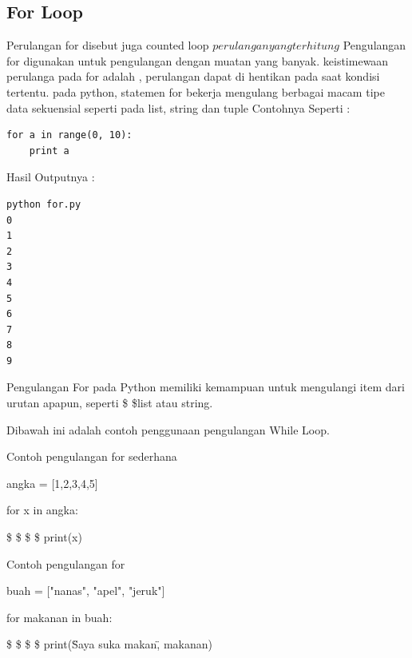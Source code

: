 \subsection{For Loop}
Perulangan for disebut juga counted loop \(perulangan yang terhitung\)
Pengulangan for digunakan untuk pengulangan dengan muatan yang banyak\cite{van2007python}.
keistimewaan perulanga pada for adalah , perulangan dapat di hentikan pada saat kondisi tertentu. pada python, statemen for bekerja mengulang berbagai macam tipe data sekuensial seperti pada list, string dan tuple
Contohnya Seperti :
\begin{verbatim}
for a in range(0, 10):
	print a
\end{verbatim}
Hasil Outputnya :
\begin{verbatim}
python for.py
0
1
2
3
4
5
6
7
8
9
\end{verbatim}

Pengulangan For pada Python memiliki kemampuan untuk mengulangi item dari urutan apapun, seperti \$  \$list atau string. \par
\vspace{\baselineskip}
\vspace{\baselineskip}
Dibawah ini adalah contoh penggunaan pengulangan While Loop. \par
\vspace{\baselineskip}
\vspace{12pt}
Contoh pengulangan for sederhana \par
\vspace{\baselineskip}
angka = [1,2,3,4,5] \par
\vspace{\baselineskip}
for x in angka: \par
\vspace{\baselineskip}
 \$  \$  \$  \$ print(x) \par
\vspace{\baselineskip}
\vspace{\baselineskip}
Contoh pengulangan for \par
\vspace{\baselineskip}
buah = ["nanas", "apel", "jeruk"] \par
\vspace{\baselineskip}
for makanan in buah: \par
\vspace{\baselineskip}
 \$  \$  \$  \$ print(\"Saya suka makan\", makanan) \par
\vspace{\baselineskip}
\vspace{\baselineskip}
\vspace{12pt}

